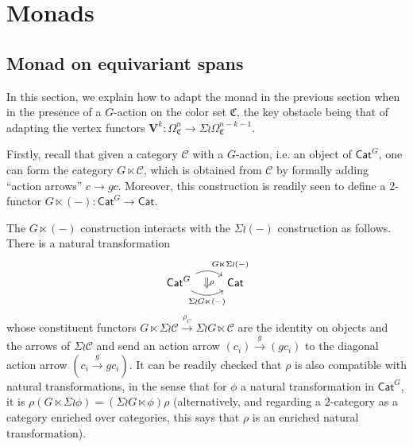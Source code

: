 \documentclass[a4paper,10pt
,draft
]{article}%
\renewcommand{\1}{\eta}%
\begin{document}
\fi






\section{Monads}



\subsection{Monad on equivariant spans}

In this section, we explain how to adapt the monad in the previous section when in the presence of a $G$-action on the color set $\mathfrak{C}$, the key obstacle being that of adapting the vertex functors
$\boldsymbol{V}^k \colon
\Omega_{\mathfrak{C}}^n \to 
\Sigma \wr \Omega_{\mathfrak{C}}^{n-k-1}$.

Firstly, recall that given a category $\mathcal{C}$ with a $G$-action, 
i.e. an object of $\mathsf{Cat}^G$, one can form the category
$G \ltimes \mathcal{C}$, which is obtained from $\mathcal{C}$ by formally adding ``action arrows'' 
$c \to g c$.
Moreover, this construction is readily seen to define a 
$2$-functor
$G \ltimes (-) \colon
\mathsf{Cat}^G \to \mathsf{Cat}$.

The $G \ltimes (-)$ construction interacts with the $\Sigma \wr (-)$ construction as follows. There is a natural transformation
\[
\begin{tikzcd}
	\mathsf{Cat}^G 
	\ar[bend left]{r}{G \ltimes \Sigma \wr (-)}[swap,name=T]{}
	\ar[bend right]{r}[swap]{\Sigma \wr G \ltimes (-)}[name=D]{} &
	\mathsf{Cat}
\arrow[Rightarrow, from=T, to=D,shorten >=0.05cm,shorten <=0.05cm,
"\rho"
]
\end{tikzcd}
\]
whose constituent functors
$G \ltimes \Sigma \wr \mathcal{C}
\xrightarrow{\rho_C}
\Sigma \wr G \ltimes \mathcal{C}$
are the identity on objects and the arrows of $\Sigma \wr \mathcal{C}$
and send an action arrow
$(c_i) \xrightarrow{g} (g c_i)$ to the diagonal action arrow
$(c_i \xrightarrow{g} g c_i)$.
It can be readily checked that $\rho$ is also compatible with natural transformations, in the sense that for 
$\phi$ a natural transformation in 
$\mathsf{Cat}^G$, it is
$\rho (G \ltimes \Sigma \wr \phi) = 
(\Sigma \wr G \ltimes \phi) \rho$
(alternatively, and regarding a $2$-category as a category enriched over categories, this says that $\rho$ is an enriched natural transformation).
\end{document}
